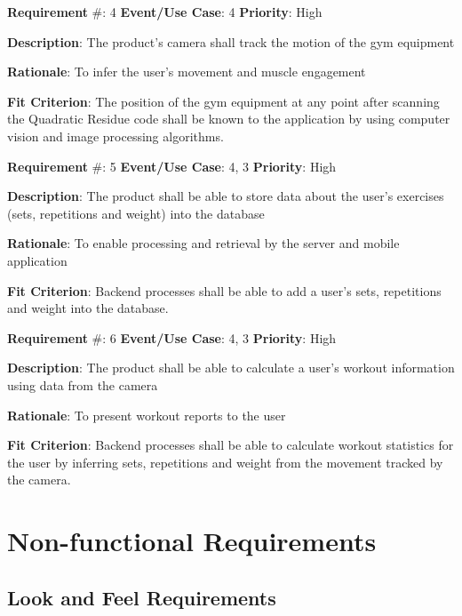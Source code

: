 \documentclass{article}
\newcommand\tab{\hspace*{2cm}}
\begin{document}
\medskip

\textbf{Requirement} \#: 4 \tab \textbf{Event/Use Case}: 4
\tab \textbf{Priority}: High

\textbf{Description}: The product’s camera shall track the motion of the gym equipment

\textbf{Rationale}: To infer the user's movement and muscle engagement

\textbf{Fit Criterion}: The position of the gym equipment at any point after scanning the Quadratic Residue code shall be known to the application by using computer vision and image processing algorithms.

\medskip

\textbf{Requirement} \#: 5 \tab \textbf{Event/Use Case}: 4, 3
\tab \textbf{Priority}: High

\textbf{Description}: The product shall be able to store data about the user’s exercises (sets, repetitions and weight) into the database

\textbf{Rationale}: To enable processing and retrieval by the server and mobile application

\textbf{Fit Criterion}: Backend processes shall be able to add a user’s sets, repetitions and weight into the database.

\medskip

\textbf{Requirement} \#: 6 \tab \textbf{Event/Use Case}: 4, 3
\tab \textbf{Priority}: High

\textbf{Description}: The product shall be able to calculate a user’s workout information using data from the camera 

\textbf{Rationale}: To present workout reports to the user

\textbf{Fit Criterion}: Backend processes shall be able to calculate workout statistics for the user by inferring sets, repetitions and weight from the movement tracked by the camera.

\medskip

\newpage
\section{Non-functional Requirements}
\subsection{Look and Feel Requirements}
\end{document}
